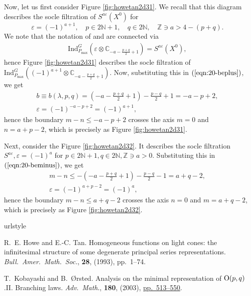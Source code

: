 \documentclass[12pt]{article} %
\theoremstyle{remark}
\begin{document}
Now, let us first consider Figure \ref{fig:howetan2d31}. We recall that this
diagram describes the socle filtration of $S^{a \varepsilon} (X^0)$ for
\[ \varepsilon = (- 1)^{a + 1}, \quad p \in 2\mathbb{N}+ 1, \quad q \in
   2\mathbb{N}, \quad \mathbb{Z} \ni a > 4 - (p + q) . \]
We note that the notation of {\cite{howe1993homogeneous}} and {\cite{KO2}} are
connected via
\begin{eqnarray}
  & \mbox{Ind}_{P_{\max}}^G \left( \varepsilon \otimes \mathbb{C}_{- a -
  \frac{p + q}{2} + 1} \right) = S^{a \varepsilon} (X^0), &  \nonumber
\end{eqnarray}
hence Figure \ref{fig:howetan2d31} describes the socle filtration of
$\mbox{Ind}_{P_{\max}}^G \left( (- 1)^{a + 1} \otimes \mathbb{C}_{- a -
\frac{p + q}{2} + 1} \right)$. Now, substituting this in
$(\ref{eqn:20-beplus})$, we get
\begin{eqnarray}
  & b \equiv b (\lambda, p, q) = \left( - a - \frac{p + q}{2} + 1 \right) -
  \frac{p - q}{2} + 1 = - a - p + 2, &  \nonumber\\
  & \varepsilon = (- 1)^{- a - p + 2} = (- 1)^{a + 1}, &  \nonumber
\end{eqnarray}
hence the boundary $m - n \leqslant - a - p + 2$ crosses the axis $m = 0$ and
$n = a + p - 2$, which is precisely as Figure \ref{fig:howetan2d31}.

Next, consider the Figure \ref{fig:howetan2d32}. It describes the socle
filtration $S^{a \varepsilon}, \varepsilon = (- 1)^a$ for $p \in 2\mathbb{N}+
1, q \in 2\mathbb{N}, \mathbb{Z} \ni a > 0$. Substituting this in
$(\ref{eqn:20-beminus})$, we get
\begin{eqnarray}
  & m - n \leqslant - \left( - a - \frac{p + q}{2} + 1 \right) - \frac{p -
  q}{2} - 1 = a + q - 2, &  \nonumber\\
  & \varepsilon = (- 1)^{a + p - 2} = (- 1)^a,^{} &  \nonumber
\end{eqnarray}
hence the boundary $m - n \leqslant a + q - 2$ crosses the axis $n = 0$ and $m
= a + q - 2$, which is precisely as Figure \ref{fig:howetan2d32}.

\begin{thebibliography}{9}
\expandafter\ifx\csname urlstyle\endcsname\relax
  \providecommand{\doi}[1]{doi:\discretionary{}{}{}#1}\else
  \providecommand{\doi}{doi:\discretionary{}{}{}\begingroup
  \urlstyle{rm}\Url}\fi

R.~E. Howe and E.-C. Tan.
\newblock Homogeneous functions on light cones: the infinitesimal structure of
  some degenerate principal series representations.
\newblock \emph{{\normalfont Bull.~Amer.~Math.~Soc.}}, \textbf{28},
  (1993), pp.~1--74.

T.~Kobayashi and B.~{\O}rsted.
\newblock Analysis on the minimal representation of\/ {${\rm O}(p,q)$}.{\;}{{\rm{II}}}. {B}ranching laws.
\newblock \emph{\normalfont Adv.~Math.}, \textbf{180}, (2003),
\href{http://dx.doi.org/10.1016/S0001-8708(03)00013-6}{pp.~513--550}.

\end{thebibliography}
\end{document}
